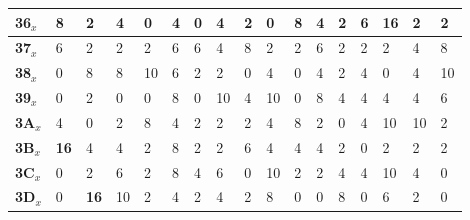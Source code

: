 \begin{longtable}[c]{|l|l|l|l|l|l|l|l|l|l|l|l|l|l|l|l|l|}
\textbf{36$_x$} & 8              & 2              & 4              & 0              & 4              & 0              & 4              & 2              & 0              & 8              & 4              & 2              & 6              & \textbf{16}             & 2              & 2              \\ \hline
\textbf{37$_x$} & 6              & 2              & 2              & 2              & 6              & 6              & 4              & 8              & 2              & 2              & 6              & 2              & 2              & 2              & 4              & 8              \\ \hline
\textbf{38$_x$} & 0              & 8              & 8              & 10             & 6              & 2              & 2              & 0              & 4              & 0              & 4              & 2              & 4              & 0              & 4              & 10             \\ \hline
\textbf{39$_x$} & 0              & 2              & 0              & 0              & 8              & 0              & 10             & 4              & 10             & 0              & 8              & 4              & 4              & 4              & 4              & 6              \\ \hline
\textbf{3A$_x$} & 4              & 0              & 2              & 8              & 4              & 2              & 2              & 2              & 4              & 8              & 2              & 0              & 4              & 10             & 10             & 2              \\ \hline
\textbf{3B$_x$} & \textbf{16}             & 4              & 4              & 2              & 8              & 2              & 2              & 6              & 4              & 4              & 4              & 2              & 0              & 2              & 2              & 2              \\ \hline
\textbf{3C$_x$} & 0              & 2              & 6              & 2              & 8              & 4              & 6              & 0              & 10             & 2              & 2              & 4              & 4              & 10             & 4              & 0              \\ \hline
\textbf{3D$_x$} & 0              & \textbf{16}             & 10             & 2              & 4              & 2              & 4              & 2              & 8              & 0              & 0              & 8              & 0              & 6              & 2              & 0              \\ \hline

\end{longtable}
